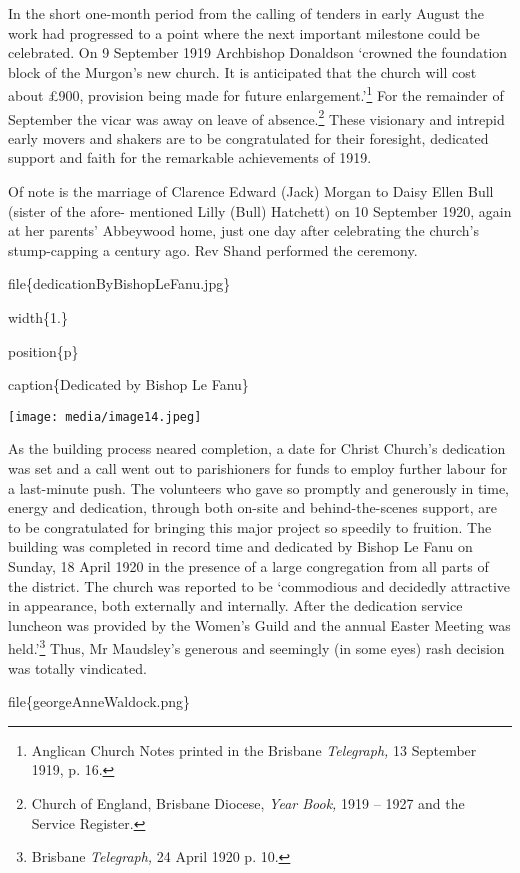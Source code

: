In the short one-month period from the calling of tenders in early August the work had progressed to a point where the next important milestone could be celebrated. On 9 September 1919 Archbishop Donaldson `crowned the foundation block of the Murgon's new church. It is anticipated that the church will cost about £900, provision being made for future enlargement.'\footnote{Anglican Church Notes printed in the Brisbane \emph{Telegraph,} 13 September 1919, p. 16.} For the remainder of September the vicar was away on leave of absence.\footnote{Church of England, Brisbane Diocese, \emph{Year Book,} 1919 -- 1927 and the Service Register.} These visionary and intrepid early movers and shakers are to be congratulated for their foresight, dedicated support and faith for the remarkable achievements of 1919.

Of note is the marriage of Clarence Edward (Jack) Morgan to Daisy Ellen Bull (sister of the afore- mentioned Lilly (Bull) Hatchett) on 10 September 1920, again at her parents' Abbeywood home, just one day after celebrating the church's stump-capping a century ago. Rev Shand performed the ceremony.

file\{dedicationByBishopLeFanu.jpg\}

width\{1.\}

position\{p\}

caption\{Dedicated by Bishop Le Fanu\}

\texttt{[image: media/image14.jpeg]}

As the building process neared completion, a date for Christ Church's dedication was set and a call went out to parishioners for funds to employ further labour for a last-minute push. The volunteers who gave so promptly and generously in time, energy and dedication, through both on-site and behind-the-scenes support, are to be congratulated for bringing this major project so speedily to fruition. The building was completed in record time and dedicated by Bishop Le Fanu on Sunday, 18 April 1920 in the presence of a large congregation from all parts of the district. The church was reported to be `commodious and decidedly attractive in appearance, both externally and internally. After the dedication service luncheon was provided by the Women's Guild and the annual Easter Meeting was held.'\footnote{Brisbane \emph{Telegraph,} 24 April 1920 p. 10.} Thus, Mr Maudsley's generous and seemingly (in some eyes) rash decision was totally vindicated.

file\{georgeAnneWaldock.png\}

